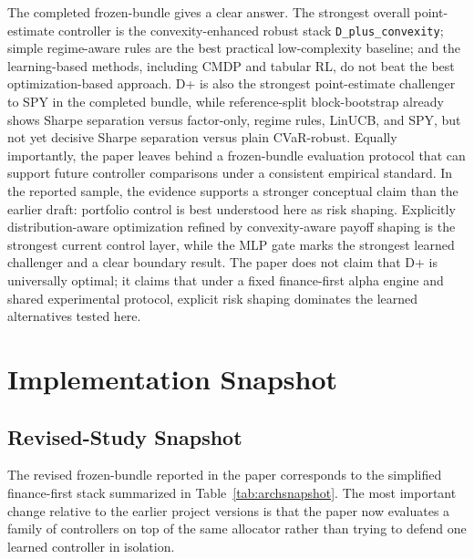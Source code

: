 \documentclass[11pt]{article}
\begin{document}
The completed frozen-bundle gives a clear answer. The strongest overall
point-estimate controller is the convexity-enhanced robust stack
\texttt{D\_plus\_convexity}; simple regime-aware rules are the best practical
low-complexity baseline; and the learning-based methods, including CMDP and
tabular RL, do not beat the best optimization-based approach. D+ is also the
strongest point-estimate challenger to SPY in the completed bundle, while
reference-split block-bootstrap already shows Sharpe separation versus
factor-only, regime rules, LinUCB, and SPY, but not yet decisive Sharpe
separation versus plain CVaR-robust. Equally importantly, the paper leaves behind a frozen-bundle evaluation protocol that can support future controller comparisons under a consistent empirical standard. In the reported sample, the evidence supports a stronger conceptual claim than the earlier draft: portfolio control is best understood here as risk shaping. Explicitly distribution-aware optimization refined by convexity-aware payoff shaping is the strongest current control layer, while the MLP gate marks the strongest learned challenger and a clear boundary result. The paper does not claim that D+ is universally optimal; it claims that under a fixed finance-first alpha engine and shared experimental protocol, explicit risk shaping dominates the learned alternatives tested here.

\appendix

\section{Implementation Snapshot}

\subsection{Revised-Study Snapshot}

The revised frozen-bundle reported in the paper corresponds to the simplified
finance-first stack summarized in Table~\ref{tab:archsnapshot}. The most
important change relative to the earlier project versions is that the paper now
evaluates a family of controllers on top of the same allocator rather than
trying to defend one learned controller in isolation.
\end{document}
